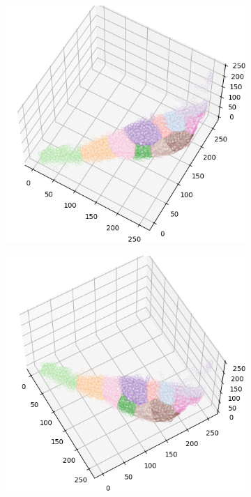 \begin{figure}[htbp]
\begin{subfigure}[t]{0.32\textwidth}
    \end{subfigure}
    \begin{subfigure}[t]{0.32\textwidth}
        \includegraphics[width=\linewidth]{../../python_code/plots/kmeans/horse-170/clusters_elev60_azim-60.png}
    \end{subfigure}
    \begin{subfigure}[t]{0.32\textwidth}
        \includegraphics[width=\linewidth]{../../python_code/plots/kmeans/horse-170/clusters_elev60_azim-30.png}

\end{subfigure}
\end{figure}
